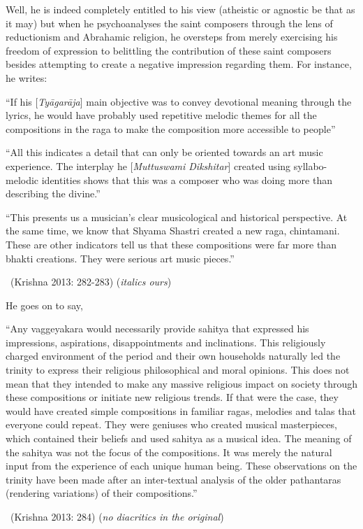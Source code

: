 Well, he is indeed completely entitled to his view (atheistic or agnostic be that as it may) but when he psychoanalyses the saint composers through the lens of reductionism and Abrahamic religion, he oversteps from merely exercising his freedom of expression to belittling the contribution of these saint composers besides attempting to create a negative impression regarding them. For instance, he writes:

\begin{myquote}
“If his [\textit{Tyāgarāja}] main objective was to convey devotional meaning through the lyrics, he would have probably used repetitive melodic themes for all the compositions in the raga to make the composition more accessible to people”
\end{myquote}

\begin{myquote}
“All this indicates a detail that can only be oriented towards an art music experience. The interplay he [\textit{Muttuswami Dikshitar}] created using syllabo-melodic identities shows that this was a composer who was doing more than describing the divine.”
\end{myquote}

\begin{myquote}
“This presents us a musician’s clear musicological and historical perspective. At the same time, we know that Shyama Shastri created a new raga, chintamani. These are other indicators tell us that these compositions were far more than bhakti creations. They were serious art music pieces.” 

~\hfill (Krishna 2013: 282-283) (\textit{italics ours})
\end{myquote}

He goes on to say,

\begin{myquote}
“Any vaggeyakara would necessarily provide sahitya that expressed his impressions, aspirations, disappointments and inclinations. This religiously charged environment of the period and their own households naturally led the trinity to express their religious philosophical and moral opinions. This does not mean that they intended to make any massive religious impact on society through these compositions or initiate new religious trends. If that were the case, they would have created simple compositions in familiar ragas, melodies and talas that everyone could repeat. They were geniuses who created musical masterpieces, which contained their beliefs and used sahitya as a musical idea. The meaning of the sahitya was not the focus of the compositions. It was merely the natural input from the experience of each unique human being. These observations on the trinity have been made after an inter-textual analysis of the older pathantaras (rendering variations) of their compositions.” 

~\hfill (Krishna 2013: 284) (\textit{no diacritics in the original})
\end{myquote}

